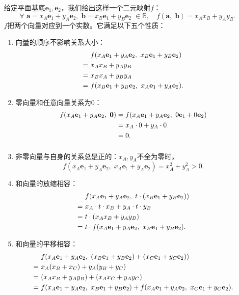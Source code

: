 \documentclass[12pt,UTF8]{ctexbook}
\begin{document}
给定平面基底$\mathbf{e}_1, \mathbf{e}_2$，我们给出这样一个二元映射$f$：
$$ \forall \,\, \mathbf{a} = x_A\mathbf{e}_1 + y_A\mathbf{e}_2, \,\, \mathbf{b} = x_B\mathbf{e}_1 + y_B\mathbf{e}_2 \,\, \in \mathbb{R}, \quad f(\mathbf{a}, \,\, \mathbf{b}) = x_Ax_B + y_Ay_B.$$
$f$把两个向量对应到一个实数。它满足以下五个性质：
\begin{enumerate}
    \item 向量的顺序不影响关系大小：
    \begin{align}
          & f(x_A\mathbf{e}_1 + y_A\mathbf{e}_2,\,\, x_B\mathbf{e}_1 + y_B\mathbf{e}_2) \notag \\
        =\,\,& x_Ax_B + y_A y_B \notag \\
        =\,\,& x_Bx_A + y_By_A \notag \\
        =\,\,& f(x_B\mathbf{e}_1 + y_B\mathbf{e}_2,\,\, x_A\mathbf{e}_1 + y_A\mathbf{e}_2). \notag
    \end{align}
    \item 零向量和任意向量关系为$0$：
    \begin{align}
        f(x_A\mathbf{e}_1 + y_A\mathbf{e}_2,\,\, \mathbf{0}) &= f(x_A\mathbf{e}_1 + y_A\mathbf{e}_2,\,\, 0\mathbf{e}_1 + 0\mathbf{e}_2) \notag \\
        &= x_A\cdot 0 + y_A\cdot 0 \notag \\
        &= 0. \notag
    \end{align}
    $$$$
    \item 非零向量与自身的关系总是正的：$x_A, y_A$不全为零时，
    $$f(x_A\mathbf{e}_1 + y_A\mathbf{e}_2,\,\, x_A\mathbf{e}_1 + y_A\mathbf{e}_2) = x_A^2 + y_A^2  > 0.$$
    \item 和向量的放缩相容：
    \begin{align}
        & f(x_A\mathbf{e}_1 + y_A\mathbf{e}_2,\,\, t\cdot (x_B\mathbf{e}_1 + y_B\mathbf{e}_2)) \notag \\
        =\,\,& x_A\cdot t\cdot x_B + y_A\cdot t\cdot y_B \notag \\
        =\,\,& t\cdot (x_Ax_B + y_Ay_B) \notag \\
        =\,\,& t\cdot f(x_A\mathbf{e}_1 + y_A\mathbf{e}_2,\,\, x_B\mathbf{e}_1 + y_B\mathbf{e}_2). \notag 
    \end{align}
    \item 和向量的平移相容：
    \begin{align}
         & f(x_A\mathbf{e}_1 + y_A\mathbf{e}_2, \,\, (x_B\mathbf{e}_1 + y_B\mathbf{e}_2) + (x_C\mathbf{e}_1 + y_C\mathbf{e}_2)) \notag \\
         =\,\,& x_A(x_B + x_C) + y_A (y_B + y_C) \notag \\
         =\,\,& (x_Ax_B + y_Ay_B) + (x_Ax_C + y_Ay_C) \notag \\
         =\,\,& f(x_A\mathbf{e}_1 + y_A\mathbf{e}_2, \,\,x_B\mathbf{e}_1 + y_B\mathbf{e}_2) + f(x_A\mathbf{e}_1 + y_A\mathbf{e}_2, \,\,x_C\mathbf{e}_1 + y_C\mathbf{e}_2). \notag
    \end{align}     
\end{enumerate}
\end{document}

